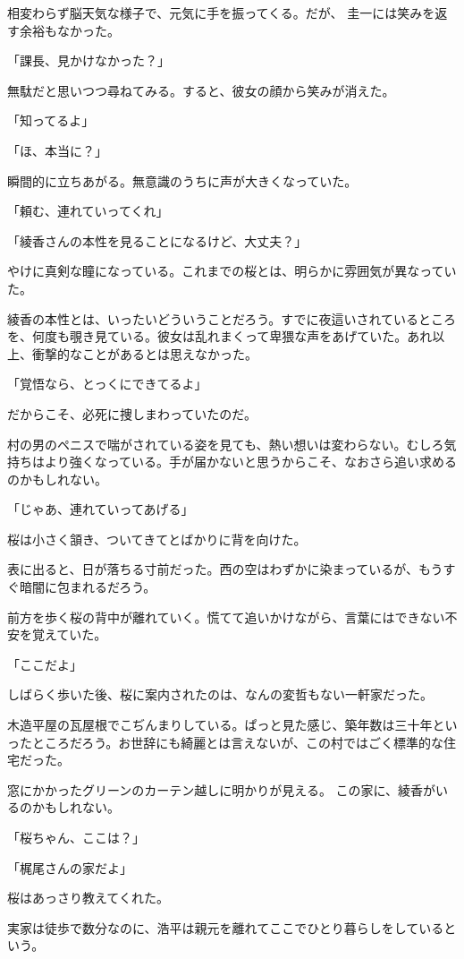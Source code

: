 ﻿\documentclass[book,tate]{jlreq}
\begin{document}
相変わらず脳天気な様子で、元気に手を振ってくる。だが、 圭一には笑みを返す余裕もなかった。

「課長、見かけなかった？」

無駄だと思いつつ尋ねてみる。すると、彼女の顔から笑みが消えた。

「知ってるよ」

「ほ、本当に？」

瞬間的に立ちあがる。無意識のうちに声が大きくなっていた。

「頼む、連れていってくれ」

「綾香さんの本性を見ることになるけど、大丈夫？」

やけに真剣な瞳になっている。これまでの桜とは、明らかに雰囲気が異なっていた。

綾香の本性とは、いったいどういうことだろう。すでに夜這いされているところを、何度も覗き見ている。彼女は乱れまくって卑猥な声をあげていた。あれ以上、衝撃的なことがあるとは思えなかった。

「覚悟なら、とっくにできてるよ」

だからこそ、必死に捜しまわっていたのだ。

村の男のペニスで喘がされている姿を見ても、熱い想いは変わらない。むしろ気持ちはより強くなっている。手が届かないと思うからこそ、なおさら追い求めるのかもしれない。

「じゃあ、連れていってあげる」

桜は小さく頷き、ついてきてとばかりに背を向けた。

表に出ると、日が落ちる寸前だった。西の空はわずかに染まっているが、もうすぐ暗闇に包まれるだろう。

前方を歩く桜の背中が離れていく。慌てて追いかけながら、言葉にはできない不安を覚えていた。

「ここだよ」

しばらく歩いた後、桜に案内されたのは、なんの変哲もない一軒家だった。

木造平屋の瓦屋根でこぢんまりしている。ぱっと見た感じ、築年数は三十年といったところだろう。お世辞にも綺麗とは言えないが、この村ではごく標準的な住宅だった。

窓にかかったグリーンのカーテン越しに明かりが見える。 この家に、綾香がいるのかもしれない。

「桜ちゃん、ここは？」

「梶尾さんの家だよ」

桜はあっさり教えてくれた。

実家は徒歩で数分なのに、浩平は親元を離れてここでひとり暮らしをしているという。
\end{document}
